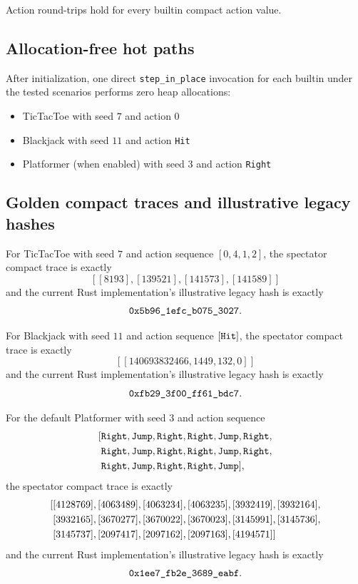\documentclass[11pt]{article}
\newcommand{\code}[1]{\ifmmode\text{\texttt{#1}}\else\texttt{#1}\fi}
\begin{document}
Action round-trips hold for every builtin compact action value.

\subsection{Allocation-free hot paths}

After initialization, one direct \code{step\_in\_place} invocation for each builtin under the tested scenarios performs zero heap allocations:
\begin{itemize}
  \item TicTacToe with seed $7$ and action $0$
  \item Blackjack with seed $11$ and action \code{Hit}
  \item Platformer (when enabled) with seed $3$ and action \code{Right}
\end{itemize}

\subsection{Golden compact traces and illustrative legacy hashes}

For TicTacToe with seed $7$ and action sequence $[0,4,1,2]$, the spectator compact trace is exactly
\[
[[8193],[139521],[141573],[141589]]
\]
and the current Rust implementation's illustrative legacy hash is exactly
\[
\code{0x5b96\_1efc\_b075\_3027}.
\]

For Blackjack with seed $11$ and action sequence $[\code{Hit}]$, the spectator compact trace is exactly
\[
[[140693832466, 1449, 132, 0]]
\]
and the current Rust implementation's illustrative legacy hash is exactly
\[
\code{0xfb29\_3f00\_ff61\_bdc7}.
\]

For the default Platformer with seed $3$ and action sequence
\[
\begin{aligned}
\relax[&\code{Right},\code{Jump},\code{Right},\code{Right},\code{Jump},\code{Right},\\
 &\code{Right},\code{Jump},\code{Right},\code{Right},\code{Jump},\code{Right},\\
 &\code{Right},\code{Jump},\code{Right},\code{Right},\code{Jump}],
\end{aligned}
\]
the spectator compact trace is exactly
\[
\begin{aligned}
\relax[&[4128769],[4063489],[4063234],[4063235],[3932419],[3932164],\\
 &[3932165],[3670277],[3670022],[3670023],[3145991],[3145736],\\
 &[3145737],[2097417],[2097162],[2097163],[4194571]]
\end{aligned}
\]
and the current Rust implementation's illustrative legacy hash is exactly
\[
\code{0x1ee7\_fb2e\_3689\_eabf}.
\]
\end{document}
